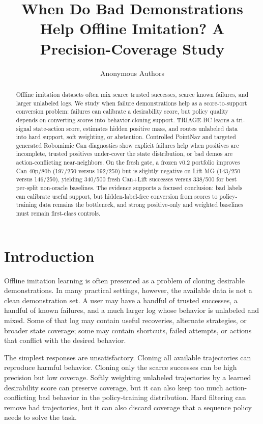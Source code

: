 \documentclass[11pt]{article}
\title{When Do Bad Demonstrations Help Offline Imitation? A Precision-Coverage Study}
\author{Anonymous Authors}
\date{}
\newcommand{\method}{TRIAGE-BC}
\begin{document}
\maketitle

\begin{abstract}
Offline imitation datasets often mix scarce trusted successes, scarce known failures, and larger unlabeled logs. We study when failure demonstrations help as a score-to-support conversion problem: failures can calibrate a desirability score, but policy quality depends on converting scores into behavior-cloning support. \method{} learns a tri-signal state-action score, estimates hidden positive mass, and routes unlabeled data into hard support, soft weighting, or abstention. Controlled PointNav and targeted generated Robomimic Can diagnostics show explicit failures help when positives are incomplete, trusted positives under-cover the state distribution, or bad demos are action-conflicting near-neighbors. On the fresh gate, a frozen v0.2 portfolio improves Can 40p/80b (197/250 versus 192/250) but is slightly negative on Lift MG (143/250 versus 146/250), yielding 340/500 fresh Can+Lift successes versus 338/500 for best per-split non-oracle baselines. The evidence supports a focused conclusion: bad labels can calibrate useful support, but hidden-label-free conversion from scores to policy-training data remains the bottleneck, and strong positive-only and weighted baselines must remain first-class controls.
\end{abstract}

\section{Introduction}

Offline imitation learning is often presented as a problem of cloning desirable demonstrations. In many practical settings, however, the available data is not a clean demonstration set. A user may have a handful of trusted successes, a handful of known failures, and a much larger log whose behavior is unlabeled and mixed. Some of that log may contain useful recoveries, alternate strategies, or broader state coverage; some may contain shortcuts, failed attempts, or actions that conflict with the desired behavior.

The simplest responses are unsatisfactory. Cloning all available trajectories can reproduce harmful behavior. Cloning only the scarce successes can be high precision but low coverage. Softly weighting unlabeled trajectories by a learned desirability score can preserve coverage, but it can also keep too much action-conflicting bad behavior in the policy-training distribution. Hard filtering can remove bad trajectories, but it can also discard coverage that a sequence policy needs to solve the task.
\end{document}
